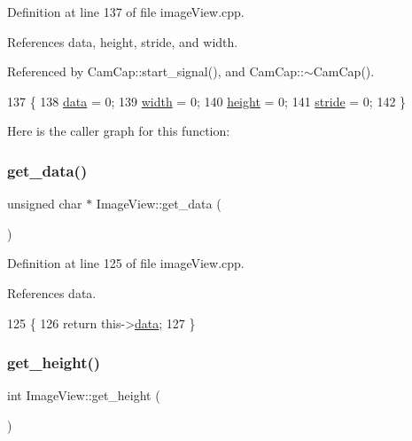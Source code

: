 Definition at line 137 of file image\+View.\+cpp.



References data, height, stride, and width.



Referenced by Cam\+Cap\+::start\+\_\+signal(), and Cam\+Cap\+::$\sim$\+Cam\+Cap().


\begin{DoxyCode}
137                                    \{
138     \hyperlink{class_image_view_aafc2f72cb5d3cbc5f23eb303b30982da}{data} = 0;
139     \hyperlink{class_image_view_a5a491c5256173430d4b16d9abea80727}{width} = 0;
140     \hyperlink{class_image_view_a3e4a6ddf0a10ae710405cdd6e73924f6}{height} = 0;
141     \hyperlink{class_image_view_aee8be5a0041dbc9c04cdc439d08cc3df}{stride} = 0;
142 \}
\end{DoxyCode}
Here is the caller graph for this function\+:
\mbox{\label{class_image_view_af3323f3942cccd3faea6ddd549c3759f}} 
\subsubsection{\texorpdfstring{get\+\_\+data()}{get\_data()}}
{\footnotesize\ttfamily unsigned char $\ast$ Image\+View\+::get\+\_\+data (\begin{DoxyParamCaption}{ }\end{DoxyParamCaption})}



Definition at line 125 of file image\+View.\+cpp.



References data.


\begin{DoxyCode}
125                                     \{
126     \textcolor{keywordflow}{return} this->\hyperlink{class_image_view_aafc2f72cb5d3cbc5f23eb303b30982da}{data};
127 \}
\end{DoxyCode}
\mbox{\label{class_image_view_ac39cc5773b4611c5835d9b62512531cc}} 
\subsubsection{\texorpdfstring{get\+\_\+height()}{get\_height()}}
{\footnotesize\ttfamily int Image\+View\+::get\+\_\+height (\begin{DoxyParamCaption}{ }\end{DoxyParamCaption})}



